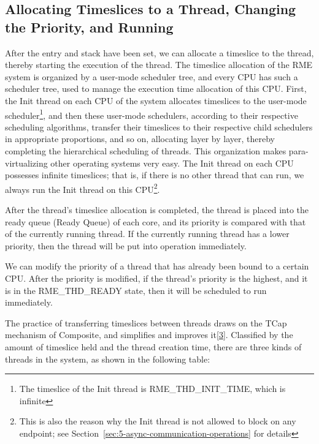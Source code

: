 \subsection{Allocating Timeslices to a Thread, Changing the Priority, and Running}\label{subsec:4-thread-time-slice-allocation-priority-change-and-run}

After the entry and stack have been set, we can allocate a timeslice to the thread, thereby starting the execution of the thread. The timeslice allocation of the RME system is organized by a user-mode scheduler tree, and every CPU has such a scheduler tree, used to manage the execution time allocation of this CPU. First, the Init thread on each CPU of the system allocates timeslices to the user-mode scheduler\footnote{The timeslice of the Init thread is RME\_THD\_INIT\_TIME, which is infinite}, and then these user-mode schedulers, according to their respective scheduling algorithms, transfer their timeslices to their respective child schedulers in appropriate proportions, and so on, allocating layer by layer, thereby completing the hierarchical scheduling of threads. This organization makes para-virtualizing other operating systems very easy. The Init thread on each CPU possesses infinite timeslices; that is, if there is no other thread that can run, we always run the Init thread on this CPU\footnote{This is also the reason why the Init thread is not allowed to block on any endpoint; see Section~\ref{sec:5-async-communication-operations} for details}.

After the thread's timeslice allocation is completed, the thread is placed into the ready queue (Ready
Queue) of each core, and its priority is compared with that of the currently running thread. If the currently running thread has a lower priority, then the thread will be put into operation immediately.

We can modify the priority of a thread that has already been bound to a certain CPU. After the priority is modified, if the thread's priority is the highest, and it is in the RME\_THD\_READY state, then it will be scheduled to run immediately.

The practice of transferring timeslices between threads draws on the TCap mechanism of Composite, and simplifies and improves it\hyperref[cite:4-3]{{[}3{]}}. Classified by the amount of timeslice held and the thread creation time, there are three kinds of threads in the system, as shown in the following table:

